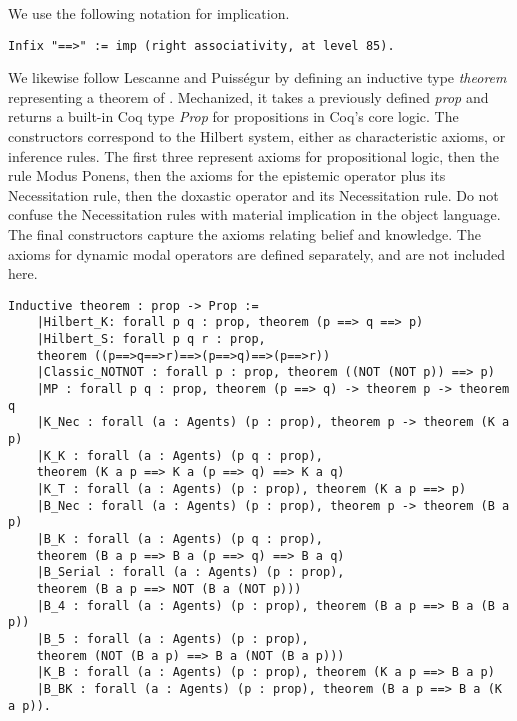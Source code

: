 We use the following notation for implication.
\begin{tcolorbox}
	\begin{lstlisting}[language=Coq]
	Infix "==>" := imp (right associativity, at level 85).
	\end{lstlisting}
\end{tcolorbox}
We likewise follow Lescanne and Puiss\'egur \cite{lescanne, puislescanne} by defining an inductive type \emph{theorem} representing a theorem of \DASL. Mechanized, it takes a previously defined \emph{prop} and returns a built-in Coq type \emph{Prop} for propositions in Coq's core logic. The constructors correspond to the Hilbert system, either as characteristic axioms, or inference rules. The first three represent axioms for propositional logic, then the rule Modus Ponens, then the axioms for the epistemic operator plus its Necessitation rule, then the doxastic operator and its Necessitation rule. Do not confuse the Necessitation rules with material implication in the object language. The final constructors capture the axioms relating belief and knowledge. The axioms for dynamic modal operators are defined separately, and are not included here.
\begin{tcolorbox}
	\begin{lstlisting}[language=Coq]
	Inductive theorem : prop -> Prop :=
	|Hilbert_K: forall p q : prop, theorem (p ==> q ==> p)
	|Hilbert_S: forall p q r : prop, 
	theorem ((p==>q==>r)==>(p==>q)==>(p==>r))
	|Classic_NOTNOT : forall p : prop, theorem ((NOT (NOT p)) ==> p)
	|MP : forall p q : prop, theorem (p ==> q) -> theorem p -> theorem q
	|K_Nec : forall (a : Agents) (p : prop), theorem p -> theorem (K a p)
	|K_K : forall (a : Agents) (p q : prop), 
	theorem (K a p ==> K a (p ==> q) ==> K a q)
	|K_T : forall (a : Agents) (p : prop), theorem (K a p ==> p)
	|B_Nec : forall (a : Agents) (p : prop), theorem p -> theorem (B a p)
	|B_K : forall (a : Agents) (p q : prop), 
	theorem (B a p ==> B a (p ==> q) ==> B a q)
	|B_Serial : forall (a : Agents) (p : prop), 
	theorem (B a p ==> NOT (B a (NOT p)))
	|B_4 : forall (a : Agents) (p : prop), theorem (B a p ==> B a (B a p))
	|B_5 : forall (a : Agents) (p : prop), 
	theorem (NOT (B a p) ==> B a (NOT (B a p)))
	|K_B : forall (a : Agents) (p : prop), theorem (K a p ==> B a p)
	|B_BK : forall (a : Agents) (p : prop), theorem (B a p ==> B a (K a p)).
	
	\end{lstlisting}\end{tcolorbox}
